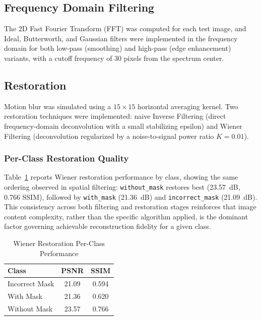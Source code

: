 \documentclass[conference]{IEEEtran}
\begin{document}
\subsection{Frequency Domain Filtering}
The 2D Fast Fourier Transform (FFT) was computed for each test image, and Ideal, Butterworth, and Gaussian filters were implemented in the frequency domain for both low-pass (smoothing) and high-pass (edge enhancement) variants, with a cutoff frequency of 30 pixels from the spectrum center.

\subsection{Restoration}
Motion blur was simulated using a $15\times15$ horizontal averaging kernel. Two restoration techniques were implemented: naive Inverse Filtering (direct frequency-domain deconvolution with a small stabilizing epsilon) and Wiener Filtering (deconvolution regularized by a noise-to-signal power ratio $K=0.01$).

\subsubsection{Per-Class Restoration Quality}
Table~\ref{tab:restorationperclass} reports Wiener restoration performance by class, showing the same ordering observed in spatial filtering: \texttt{without\_mask} restores best (23.57~dB, 0.766 SSIM), followed by \texttt{with\_mask} (21.36~dB) and \texttt{incorrect\_mask} (21.09~dB). This consistency across both filtering and restoration stages reinforces that image content complexity, rather than the specific algorithm applied, is the dominant factor governing achievable reconstruction fidelity for a given class.

\begin{table}[h]
\caption{Wiener Restoration Per-Class Performance}
\label{tab:restorationperclass}
\centering
\begin{tabular}{lcc}
\toprule
Class & PSNR & SSIM \\
\midrule
Incorrect Mask & 21.09 & 0.594 \\
With Mask & 21.36 & 0.620 \\
Without Mask & 23.57 & 0.766 \\
\bottomrule
\end{tabular}
\end{table}
\end{document}
